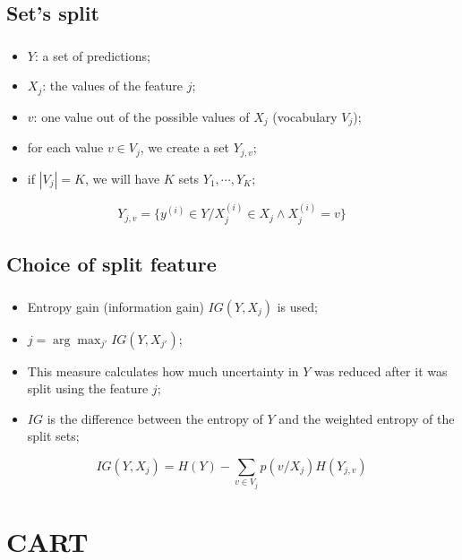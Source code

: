 \documentclass[xcolor=table]{beamer}
\begin{document}
\subsection{Set's split}

\begin{frame}
	\frametitle{\insertsection}
	\framesubtitle{\insertsubsection}
	
	\begin{itemize}
		\item $Y$: a set of predictions;
		\item $X_j$: the values of the feature $j$;
		\item $v$: one value out of the possible values of $X_j$ (vocabulary $V_j$);
		\item for each value $v \in V_j$, we create a set $Y_{j, v}$;
		\item if $|V_j| = K$, we will have $K$ sets $Y_1, \cdots, Y_K$;
	\end{itemize}
	
	\[Y_{j,v} = \{y^{(i)} \in Y / X_j^{(i)} \in X_j \wedge X_j^{(i)} = v\}\]

	
\end{frame}

\subsection{Choice of split feature}

\begin{frame}
	\frametitle{\insertsection}
	\framesubtitle{\insertsubsection}
	
	\begin{itemize}
		\item Entropy gain (information gain) $IG(Y, X_j)$ is used;
		\item $j = \arg\max_{j'} IG(Y, X_{j'})$;
		\item This measure calculates how much uncertainty in $Y$ was reduced after it was split using the feature $j$;
		\item $ IG $ is the difference between the entropy of $Y$ and the weighted entropy of the split sets;
	\end{itemize}

	\[IG(Y, X_j) = H(Y) - \sum_{v \in V_j} p(v/X_j) H(Y_{j, v})\]
	
	
\end{frame}

\section{CART}
\end{document}
